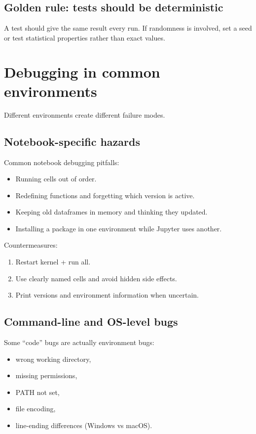 \subsection{Golden rule: tests should be deterministic}
A test should give the same result every run. If randomness is involved, set a seed or test statistical properties rather than exact values.

\section{Debugging in common environments}
Different environments create different failure modes.

\subsection{Notebook-specific hazards}
Common notebook debugging pitfalls:
\begin{itemize}[noitemsep]
  \item Running cells out of order.
  \item Redefining functions and forgetting which version is active.
  \item Keeping old dataframes in memory and thinking they updated.
  \item Installing a package in one environment while Jupyter uses another.
\end{itemize}

Countermeasures:
\begin{enumerate}[noitemsep]
  \item Restart kernel + run all.
  \item Use clearly named cells and avoid hidden side effects.
  \item Print versions and environment information when uncertain.
\end{enumerate}

\subsection{Command-line and OS-level bugs}
Some ``code'' bugs are actually environment bugs:
\begin{itemize}[noitemsep]
  \item wrong working directory,
  \item missing permissions,
  \item PATH not set,
  \item file encoding,
  \item line-ending differences (Windows vs macOS).
\end{itemize}

